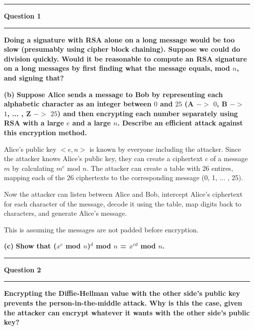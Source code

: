 \documentclass[11pt]{article}
\newcommand\question[2]{\vspace{.25in}\hrule\textbf{#1}\vspace{.5em}\hrule\vspace{.10in}}
\renewcommand\part[1]{\vspace{.10in}\textbf{(#1)}}
\begin{document}
\raggedright
\newcommand\NAME{Jake Pitkin}  %
\newcommand\UID{u0891770}     %
\newcommand\HWNUM{3}              %

\question{Question 1}

\part{a} \textbf{Doing a signature with RSA alone on a long message would be too slow (presumably using cipher block chaining). Suppose we could do division quickly. Would it be reasonable to compute an RSA signature on a long messages by first finding what the message equals, mod $n$, and signing that?}



\part{b} \textbf{Suppose Alice sends a message to Bob by representing each alphabetic character as an integer between $0$ and $25$ (A $->$ $0$, B $->$ $1$, ... , Z $->$ $25$) and then encrypting each number separately using RSA with a large $e$ and a large $n$. Describe an efficient attack against this encryption method.}

Alice's public key ${<}e, n{>}$ is known by everyone including the attacker. Since the attacker knows Alice's public key, they can create a ciphertext $c$ of a message $m$ by calculating $m^e$ mod $n$. The attacker can create a table with 26 entires, mapping each of the 26 ciphertexts to the corresponding message (0, 1, ... , 25). 

Now the attacker can listen between Alice and Bob, intercept Alice's ciphertext for each character of the message, decode it using the table, map digits back to characters, and generate Alice's message.

This is assuming the messages are not padded before encryption.

\part{c} \textbf{Show that ($x^c$ mod $n$)$^d$ mod $n$ = $x^{cd}$ mod $n$.}

\question{Question 2}

\part{a} \textbf{Encrypting the Diffie-Hellman value with the other side's public key prevents the person-in-the-middle attack. Why is this the case, given the attacker can encrypt whatever it wants with the other side's public key?}
\end{document}
